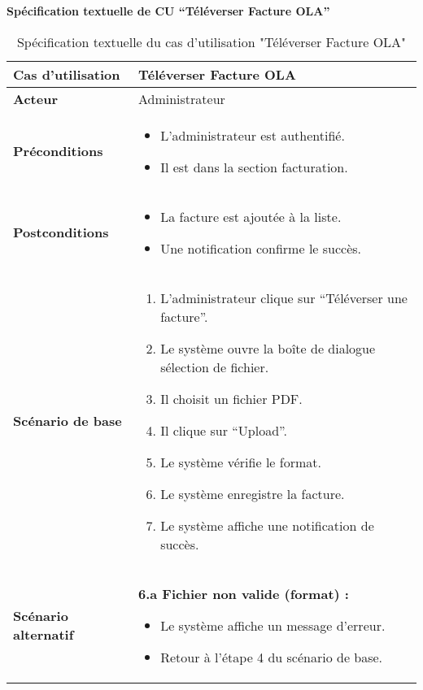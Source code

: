 \documentclass[a4paper,11pt]{report}
\begin{document}
\textbf{Spécification textuelle de CU “Téléverser Facture OLA”}

\begin{table}[H]
  \centering
  \renewcommand{\arraystretch}{1.5}
  \caption{Spécification textuelle du cas d'utilisation "Téléverser Facture OLA"}
  \begin{tabularx}{\textwidth}{|l|X|}
    \hline
    \textbf{Cas d'utilisation} & Téléverser Facture OLA \\ \hline
    \textbf{Acteur}            & Administrateur \\ \hline
    \textbf{Préconditions}     & 
      \begin{itemize}
        \item L’administrateur est authentifié.
        \item Il est dans la section facturation.
      \end{itemize} \\ \hline
    \textbf{Postconditions}    & 
      \begin{itemize}
        \item La facture est ajoutée à la liste.
        \item Une notification confirme le succès.
      \end{itemize} \\ \hline
    \textbf{Scénario de base}  & 
      \begin{enumerate}
        \item L’administrateur clique sur “Téléverser une facture”.
        \item Le système ouvre la boîte de dialogue sélection de fichier.
        \item Il choisit un fichier PDF.
        \item Il clique sur “Upload”.
        \item Le système vérifie le format.
        \item Le système enregistre la facture.
        \item Le système affiche une notification de succès.
      \end{enumerate} \\ \hline
    \textbf{Scénario alternatif} & 
      \textbf{6.a Fichier non valide (format) :}
      \begin{itemize}
        \item Le système affiche un message d’erreur.
        \item Retour à l’étape 4 du scénario de base.
      \end{itemize} \\ \hline
  \end{tabularx}
\end{table}
\end{document}
